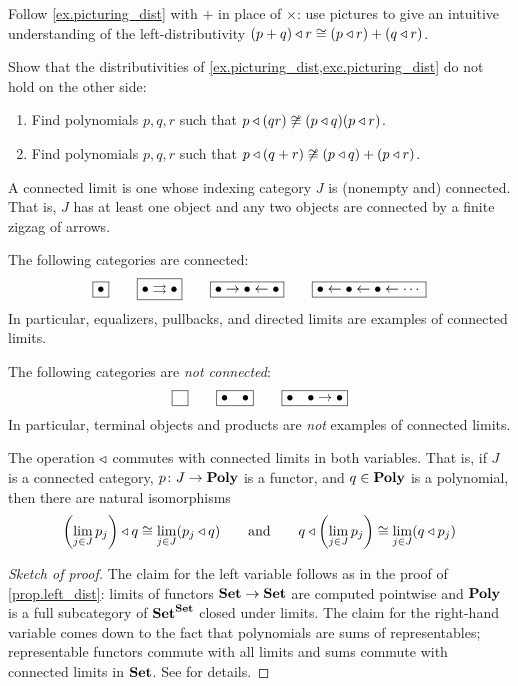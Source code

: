 \documentclass[DynamicalBook]{subfiles}
\begin{document}
\begin{exercise}\label{exc.picturing_dist}
Follow \cref{ex.picturing_dist} with $+$ in place of $\times$: use pictures to give an intuitive understanding of the left-distributivity $(p+q)\mathbin{\triangleleft} r\cong (p\mathbin{\triangleleft} r)+(q\mathbin{\triangleleft} r)$.
\end{exercise}

\begin{exercise}
Show that the distributivities of \cref{ex.picturing_dist,exc.picturing_dist} do not hold on the other side:
\begin{enumerate}
	\item Find polynomials $p,q,r$ such that $p\mathbin{\triangleleft} (qr)\not\cong(p\mathbin{\triangleleft} q)(p\mathbin{\triangleleft} r)$.
	\item Find polynomials $p,q,r$ such that $p\mathbin{\triangleleft} (q+r)\not\cong(p\mathbin{\triangleleft} q)+(p\mathbin{\triangleleft} r)$.
\qedhere
\end{enumerate}
\end{exercise}

A connected limit is one whose indexing category $J$ is (nonempty and) connected. That is, $J$ has at least one object and any two objects are connected by a finite zigzag of arrows.

\begin{example}
The following categories are connected:
\[
\fbox{$\bullet$}
\qquad
\fbox{$\bullet\rightrightarrows\bullet$}
\qquad
\fbox{$\bullet\to\bullet\leftarrow\bullet$}
\qquad
\fbox{$\bullet\leftarrow\bullet\leftarrow\bullet\leftarrow\cdots$}
\]
In particular, equalizers, pullbacks, and directed limits are examples of connected limits. 

The following categories are \emph{not connected}:
\[
\fbox{$\phantom{\bullet}$}
\qquad
\fbox{$\bullet\quad\bullet$}
\qquad
\fbox{$\bullet\quad\bullet\to \bullet$}
\]
In particular, terminal objects and products are \emph{not} examples of connected limits.
\end{example}

\begin{theorem}\label{thm.connected_limits}
The operation $\mathbin{\triangleleft}$ commutes with connected limits in both variables. That is, if $J$ is a connected category, $p\colon J\to\textbf{Poly}$ is a functor, and $q\in\textbf{Poly}$ is a polynomial, then there are natural isomorphisms
\[
	\left(\lim_{j\in J} p_j\right)\mathbin{\triangleleft} q\cong \lim_{j\in J}(p_j\mathbin{\triangleleft} q)
	\qquad\text{and}\qquad
	q\mathbin{\triangleleft}\left(\lim_{j\in J} p_j\right)\cong \lim_{j\in J}(q\mathbin{\triangleleft} p_j)
\]
\end{theorem}
\begin{proof}[Sketch of proof]
The claim for the left variable follows as in the proof of \cref{prop.left_dist}: limits of functors $\textbf{Set}\to\textbf{Set}$ are computed pointwise and $\textbf{Poly}$ is a full subcategory of $\textbf{Set}^{\textbf{Set}}$ closed under limits. The claim for the right-hand variable comes down to the fact that polynomials are sums of representables; representable functors commute with all limits and sums commute with connected limits in $\textbf{Set}$. See \cite[Proposition 1.6]{kock2012polynomial} for details.
\end{proof}
\end{document}
